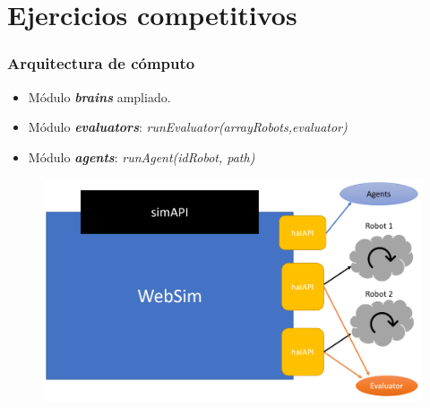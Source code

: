 \documentclass[xcolor={table}]{beamer}
\begin{document}
		\section{Ejercicios competitivos}
		\begin{frame}
			\frametitle{Arquitectura de cómputo}

			\begin{itemize}
			    \item \large{Módulo \textit{\textbf{brains}} ampliado.}
			    \item \large{Módulo \textit{\textbf{evaluators}}:} \normalsize{\textit{runEvaluator(arrayRobots,evaluator)}}
	
			    \item \large{Módulo \textit{\textbf{agents}}:} \normalsize{\textit{runAgent(idRobot, path)} }
			   
			\end{itemize}
			\begin{figure}
			    \centering			    \includegraphics[scale=0.4]{img/arquitectura.png}
			\end{figure}
		\end{frame}
		
\end{document}
